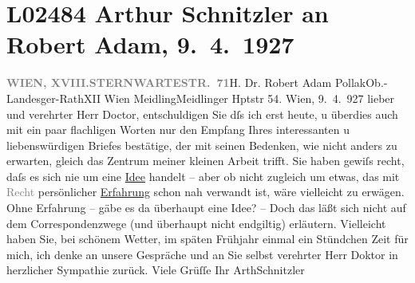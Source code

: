 

\section[Arthur Schnitzler an Robert Adam, 9. 4. 1927]{L02484 Arthur Schnitzler an Robert Adam, 9. 4. 1927}
\nopagebreak{}
\rehead{ }\normalsize\beginnumbering{}
\toendnotes[C]{\smallbreak\pagebreak[2]}
\toendnotes[C]{\smallbreak}\pstart{}{\pb}\label{T_L02484-1v}\label{T_L02484-1}\pend{}\pstart{}\textcolor{gray}{\textbf{WIEN, XVIII.}}\pend{}\pstart{}\textcolor{gray}{\textbf{STERNWARTESTR. 71}}\pend{}{\bigskip}\pstart{}H. Dr. Robert Adam Pollak\pend{}\pstart{}Ob.-Landesger-Rath\pend{}\pstart{}XII Wien Meidling\pend{}\pstart{}Meidlinger Hptstr 54.\pend{}{\bigskip}\vspace{1em}
\pstart
           \raggedleft{}{\pb}Wien, 9. 4. 927\pend
           \vspace{0.5em}
\pstart
           lieber und verehrter Herr Doctor, entschuldigen Sie dſs ich erst
               heute, u überdies auch mit ein paar flachligen Worten nur den Empfang Ihres
               interessanten u liebenswürdigen Briefes bestätige, der mit seinen Bedenken, wie nicht
               anders zu erwarten, gleich das Zentrum meiner kleinen Arbeit trifft. Sie haben gewiſs recht, daſs es sich nie um
               eine \uline{Idee} handelt – aber ob nicht zugleich um etwas,
               das mit \textcolor{gray}{Recht} persönlicher \uline{Erfahrung} schon nah verwandt ist, wäre vielleicht zu erwägen. Ohne Erfahrung
               – gäbe es da{\geminationn} überhaupt eine Idee? – Doch das läßt {\pb}sich nicht auf dem Correspondenzwege (und überhaupt nicht
               endgiltig) erläutern. Vielleicht haben Sie, bei schönem Wetter, im späten Frühjahr
               einmal ein Stündchen Zeit für mich, ich denke an unsere Gespräche und an Sie selbst
               verehrter Herr Doktor in herzlicher Sympathie zurück.\pend
           \pstart Viele Grüſſe Ihr \spacefill\mbox{ArthSchnitzler}\pend{}\endnumbering{}  
      